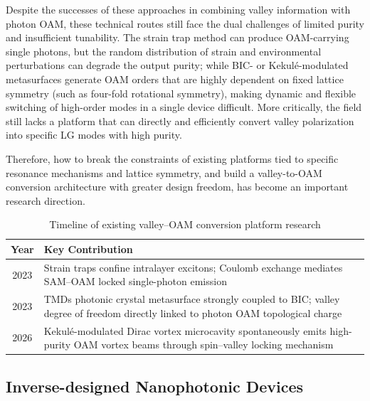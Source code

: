 Despite the successes of these approaches in combining valley information with photon OAM, these technical routes still face the dual challenges of limited purity and insufficient tunability. The strain trap method can produce OAM-carrying single photons, but the random distribution of strain and environmental perturbations can degrade the output purity; while BIC- or Kekulé-modulated metasurfaces generate OAM orders that are highly dependent on fixed lattice symmetry (such as four-fold rotational symmetry), making dynamic and flexible switching of high-order modes in a single device difficult. More critically, the field still lacks a platform that can directly and efficiently convert valley polarization into specific LG modes with high purity.

Therefore, how to break the constraints of existing platforms tied to specific resonance mechanisms and lattice symmetry, and build a valley-to-OAM conversion architecture with greater design freedom, has become an important research direction.

\begin{table}[H]
\centering
\caption{Timeline of existing valley--OAM conversion platform research}
\label{tab:timeline_v2oam}
\small
\begin{tabular}{c p{11cm}}
\toprule
\textbf{Year} & \textbf{Key Contribution} \\
\midrule
2023 & Strain traps confine intralayer excitons; Coulomb exchange mediates SAM--OAM locked single-photon emission \cite{zhang2023single} \\
2023 & TMDs photonic crystal metasurface strongly coupled to BIC; valley degree of freedom directly linked to photon OAM topological charge \cite{li2023valley} \\
2026 & Kekulé-modulated Dirac vortex microcavity spontaneously emits high-purity OAM vortex beams through spin--valley locking mechanism \cite{li2026unveiling} \\
\bottomrule
\end{tabular}
\end{table}

\subsection{Inverse-designed Nanophotonic Devices}

